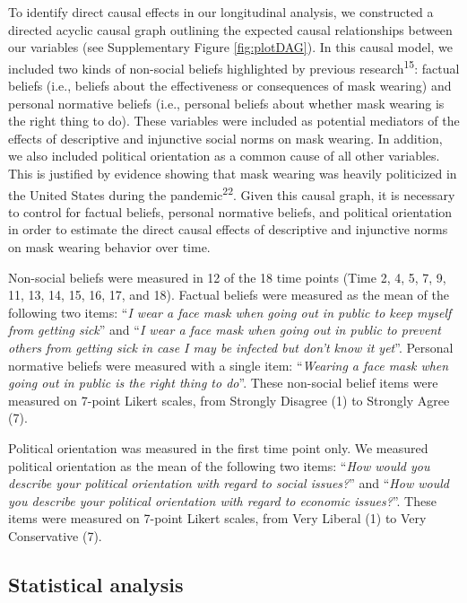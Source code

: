 \documentclass[
  man, donotrepeattitle,floatsintext]{apa6}
\begin{document}
To identify direct causal effects in our longitudinal analysis, we constructed a directed acyclic causal graph outlining the expected causal relationships between our variables (see Supplementary Figure \ref{fig:plotDAG}). In this causal model, we included two kinds of non-social beliefs highlighted by previous research\textsuperscript{15}: factual beliefs (i.e., beliefs about the effectiveness or consequences of mask wearing) and personal normative beliefs (i.e., personal beliefs about whether mask wearing is the right thing to do). These variables were included as potential mediators of the effects of descriptive and injunctive social norms on mask wearing. In addition, we also included political orientation as a common cause of all other variables. This is justified by evidence showing that mask wearing was heavily politicized in the United States during the pandemic\textsuperscript{22}. Given this causal graph, it is necessary to control for factual beliefs, personal normative beliefs, and political orientation in order to estimate the direct causal effects of descriptive and injunctive norms on mask wearing behavior over time.

Non-social beliefs were measured in 12 of the 18 time points (Time 2, 4, 5, 7, 9, 11, 13, 14, 15, 16, 17, and 18). Factual beliefs were measured as the mean of the following two items: ``\emph{I wear a face mask when going out in public to keep myself from getting sick}'' and ``\emph{I wear a face mask when going out in public to prevent others from getting sick in case I may be infected but don't know it yet}''. Personal normative beliefs were measured with a single item: ``\emph{Wearing a face mask when going out in public is the right thing to do}''. These non-social belief items were measured on 7-point Likert scales, from Strongly Disagree (1) to Strongly Agree (7).

Political orientation was measured in the first time point only. We measured political orientation as the mean of the following two items: ``\emph{How would you describe your political orientation with regard to social issues?}'' and ``\emph{How would you describe your political orientation with regard to economic issues?}''. These items were measured on 7-point Likert scales, from Very Liberal (1) to Very Conservative (7).

\hypertarget{statistical-analysis}{%
\subsection{Statistical analysis}\label{statistical-analysis}}
\end{document}
